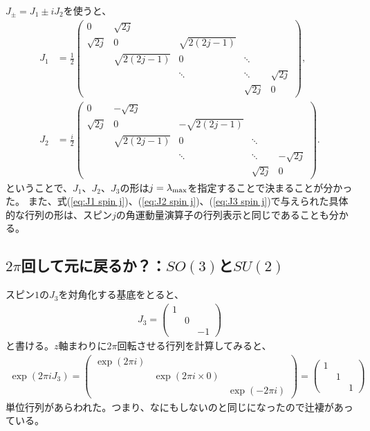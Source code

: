 \documentclass[10pt,a4paper]{jarticle}
\begin{document}
%
$J_\pm = J_1 \pm i J_2$を使うと、
\begin{align}
J_1 &= \frac{1}{2} \left(\begin{array}{ccccc}
0& \sqrt{2j} &&& \\
\sqrt{2j} &0& \sqrt{2(2j-1)} && \\
& \sqrt{2(2j-1)} &0& \ddots & \\
&& \ddots &\ddots& \sqrt{2j} \\
&&& \sqrt{2j} &0
\end{array}\right), \label{eq:J1 spin j}\\
%
J_2 &= \frac{i}{2} \left(\begin{array}{ccccc}
0& -\sqrt{2j} &&& \\
\sqrt{2j} &0& -\sqrt{2(2j-1)} && \\
& \sqrt{2(2j-1)} &0& \ddots & \\
&& \ddots &\ddots& -\sqrt{2j} \\
&&& \sqrt{2j} &0
\end{array}\right). \label{eq:J2 spin j}
\end{align}
ということで、$J_1$、$J_2$、$J_3$の形は$j = \lambda_{\rm max}$を指定することで決まることが分かった。
また、式(\ref{eq:J1 spin j})、(\ref{eq:J2 spin j})、(\ref{eq:J3 spin j})で与えられた具体的な行列の形は、スピン$j$の角運動量演算子の行列表示と同じであることも分かる。


\subsection{$2\pi$回して元に戻るか？：$SO(3)$と$SU(2)$}
スピン$1$の$J_3$を対角化する基底をとると、
\begin{align}
J_3 = \left(\begin{array}{ccc}
1 && \\
& 0 & \\
&& -1 
\end{array}\right)
\end{align}
と書ける。$z$軸まわりに$2\pi$回転させる行列を計算してみると、
\begin{align}
\exp\left( 2\pi i J_3 \right)
= \left(\begin{array}{ccc}
\exp(2\pi i) && \\
& \exp(2\pi i \times 0) & \\
&& \exp(-2\pi i) 
\end{array}\right)
= \left(\begin{array}{ccc}
1 && \\
& 1 & \\
&& 1
\end{array}\right)
\end{align}
単位行列があらわれた。つまり、なにもしないのと同じになったので辻褄があっている。
\end{document}
